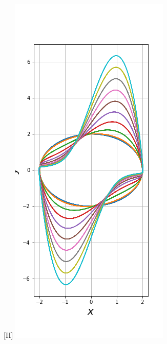 \documentclass{article}
\begin{document}
\begin{center}[H]
	\centering
    \includegraphics[width=\linewidth]{SegundaFig.png}
\end{center}
\end{document}
